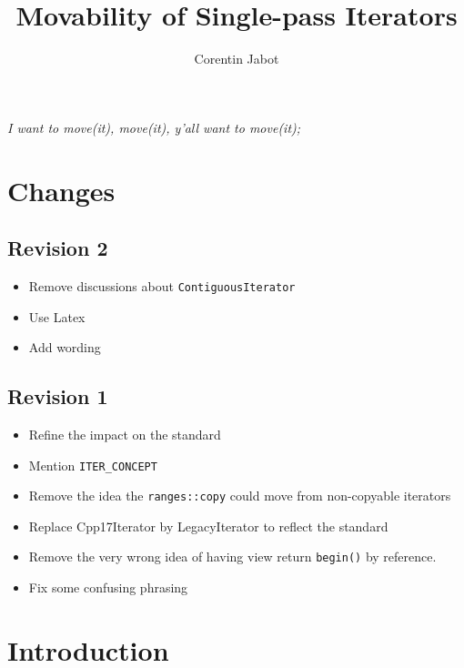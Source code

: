 \documentclass{wg21}
\title{Movability of Single-pass Iterators}
\author{Corentin Jabot}{corentin.jabot@gmail.com}
\begin{document}
\maketitle

\begin{flushright}
\hfill \break
\hfill \break
\textit{I want to move(it), move(it), y'all want to move(it);}
\end{flushright}

\hypertarget{changes}{%
	\section{Changes}\label{changes}}

\hypertarget{revision-2}{%
	\subsection{Revision 2}\label{revision-2}}

\begin{itemize}
	\item Remove discussions about \texttt{ContiguousIterator}
	\item Use Latex
	\item Add wording
\end{itemize}

\hypertarget{revision-1}{%
	\subsection{Revision 1}\label{revision-1}}

\begin{itemize}
	\item
	Refine the impact on the standard
	\item
	Mention \texttt{ITER\_CONCEPT}
	\item
	Remove the idea the \texttt{ranges::copy} could move from non-copyable
	iterators
	\item
	Replace Cpp17Iterator by LegacyIterator to reflect the standard
	\item
	Remove the very wrong idea of having view return \texttt{begin()} by
	reference.
	\item
	Fix some confusing phrasing
\end{itemize}

\hypertarget{introduction}{%
	\section{Introduction}\label{introduction}}
\end{document}
